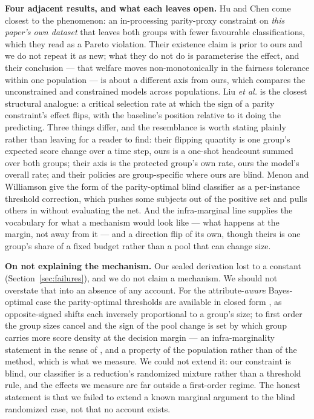 \documentclass[conference]{IEEEtran}
\begin{document}
\textbf{Four adjacent results, and what each leaves open.} Hu and Chen \cite{hu2020} come
closest to the phenomenon: an in-processing parity-proxy constraint on \emph{this paper's own
dataset} that leaves both groups with fewer favourable classifications, which they read as a
Pareto violation. Their existence claim is prior to ours and we do not repeat it as new; what
they do not do is parameterise the effect, and their conclusion --- that welfare moves
non-monotonically in the fairness tolerance within one population --- is about a different
axis from ours, which compares the unconstrained and constrained models across populations.
Liu \emph{et al.} \cite{liu2018} is the closest structural analogue: a critical selection rate
at which the sign of a parity constraint's effect flips, with the baseline's position relative
to it doing the predicting. Three things differ, and the resemblance is worth stating plainly
rather than leaving for a reader to find: their flipping quantity is one group's expected
score change over a time step, ours is a one-shot headcount summed over both groups; their
axis is the protected group's own rate, ours the model's overall rate; and their policies are
group-specific where ours are blind. Menon and Williamson \cite{menon2018} give the form of
the parity-optimal blind classifier as a per-instance threshold correction, which pushes some
subjects out of the positive set and pulls others in without evaluating the net. And the
infra-marginal line \cite{corbett2017,corbett2023} supplies the vocabulary for what a mechanism
would look like --- what happens at the margin, not away from it --- and a direction flip of
its own, though theirs is one group's share of a fixed budget rather than a pool that can
change size.

\textbf{On not explaining the mechanism.} Our sealed derivation lost to a constant
(Section~\ref{sec:failures}), and we do not claim a mechanism. We should not overstate that
into an absence of any account. For the attribute-\emph{aware} Bayes-optimal case the
parity-optimal thresholds are available in closed form \cite{zeng2022}, as opposite-signed
shifts each inversely proportional to a group's size; to first order the group sizes cancel
and the sign of the pool change is set by which group carries more score density at the
decision margin --- an infra-marginality statement in the sense of \cite{corbett2023}, and a
property of the population rather than of the method, which is what we measure. We could not
extend it: our constraint is blind, our classifier is a reduction's randomized mixture rather
than a threshold rule, and the effects we measure are far outside a first-order regime. The
honest statement is that we failed to extend a known marginal argument to the blind
randomized case, not that no account exists.
\end{document}
